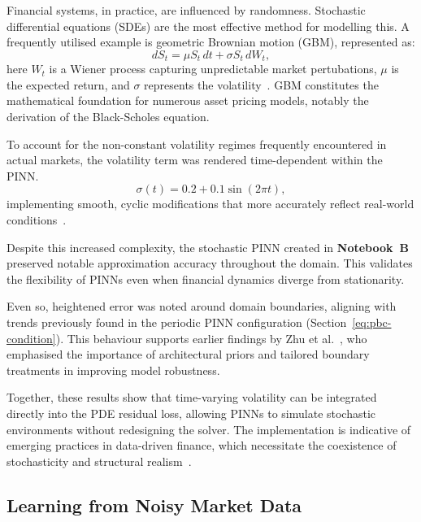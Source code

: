 \documentclass[12pt,a4paper]{article}
\begin{document}
Financial systems, in practice, are influenced by randomness. Stochastic differential equations (SDEs) are the most effective method for modelling this. A frequently utilised example is geometric Brownian motion (GBM), represented as:
\begin{equation}
dS_t = \mu S_t\,dt + \sigma S_t\,dW_t,
\label{eq:gbm}
\end{equation}
here \(W_t\) is a Wiener process capturing unpredictable market pertubations, \(\mu\) is the expected return, and \(\sigma\) represents the volatility~\cite{zang2020adaptive}. GBM constitutes the mathematical foundation for numerous asset pricing models, notably the derivation of the Black-Scholes equation.

To account for the non-constant volatility regimes frequently encountered in actual markets, the volatility term was rendered time-dependent within the PINN.
\begin{equation}
\sigma(t) = 0.2 + 0.1 \sin(2\pi t),
\label{eq:sigmoid-volatility}
\end{equation}
implementing smooth, cyclic modifications that more accurately reflect real-world conditions~\cite{sirignano2018deep}.

Despite this increased complexity, the stochastic PINN created in \textbf{Notebook~B} preserved notable approximation accuracy throughout the domain. This validates the flexibility of PINNs even when financial dynamics diverge from stationarity. 

Even so, heightened error was noted around domain boundaries, aligning with trends previously found in the periodic PINN configuration (Section~\ref{eq:pbc-condition}). This behaviour supports earlier findings by Zhu et al.~\cite{zhu2022periodic}, who emphasised the importance of architectural priors and tailored boundary treatments in improving model robustness.

Together, these results show that time-varying volatility can be integrated directly into the PDE residual loss, allowing PINNs to simulate stochastic environments without redesigning the solver. The implementation is indicative of emerging practices in data-driven finance, which necessitate the coexistence of stochasticity and structural realism~\cite{karniadakis2021physics}.

\subsection{Learning from Noisy Market Data}
\end{document}
